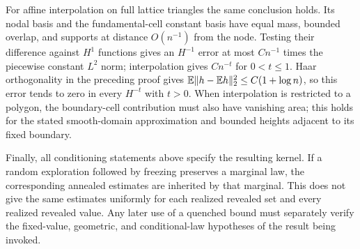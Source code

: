 For affine interpolation on full lattice triangles the same conclusion
holds. Its nodal basis and the fundamental-cell constant basis have equal
mass, bounded overlap, and supports at distance $O(n^{-1})$ from the node.
Testing their difference against $H^1$ functions gives an $H^{-1}$ error
at most $Cn^{-1}$ times the piecewise constant $L^2$ norm; interpolation
gives $Cn^{-t}$ for $0<t\le1$. Haar orthogonality in the preceding proof
gives $\mathbb E\|h-\mathbb E h\|_2^2\le C(1+\log n)$, so this error tends to zero
in every $H^{-t}$ with $t>0$. When interpolation is restricted to a polygon,
the boundary-cell contribution must also have vanishing area; this holds
for the stated smooth-domain approximation and bounded heights adjacent
to its fixed boundary.

Finally, all conditioning statements above specify the resulting kernel.
If a random exploration followed by freezing preserves a marginal law,
the corresponding annealed estimates are inherited by that marginal.
This does not give the same estimates uniformly for each realized revealed
set and every realized revealed value. Any later use of a quenched bound
must separately verify the fixed-value, geometric, and conditional-law
hypotheses of the result being invoked.
